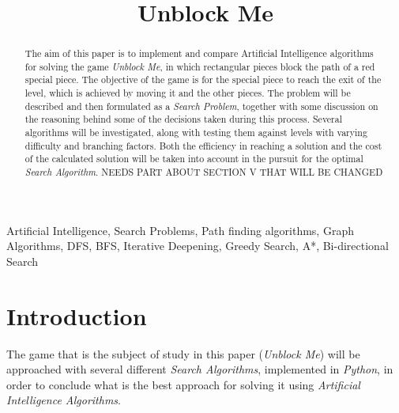 \documentclass[conference]{IEEEtran}
\begin{document}
\title{Unblock Me}

\author{
\and
{}
\and
{}
}

\maketitle

\begin{abstract}
The aim of this paper is to implement and compare Artificial Intelligence algorithms for solving the game \textit{Unblock Me}, in which rectangular pieces block the path of a red special piece. The objective of the game is for the special piece to reach the exit of the level, which is achieved by moving it and the other pieces.
The problem will be described and then formulated as a \textit{Search Problem}, together with some discussion on the reasoning behind some of the decisions taken during this process.
Several algorithms will be investigated, along with testing them against levels with varying difficulty and branching factors. Both the efficiency in reaching a solution and the cost of the calculated solution will be taken into account in the pursuit for the optimal \textit{Search Algorithm}.
{\huge NEEDS PART ABOUT SECTION V THAT WILL BE CHANGED}

\end{abstract}

\begin{IEEEkeywords}
Artificial Intelligence, Search Problems, Path finding algorithms, Graph Algorithms, DFS, BFS, Iterative Deepening, Greedy Search, A*, Bi-directional Search
\end{IEEEkeywords}

\section{Introduction}
The game that is the subject of study in this paper (\textit{Unblock Me}) will be approached with several different \textit{Search Algorithms}, implemented in \textit{Python}, in order to conclude what is the best approach for solving it using \textit{Artificial Intelligence Algorithms}.
\end{document}

